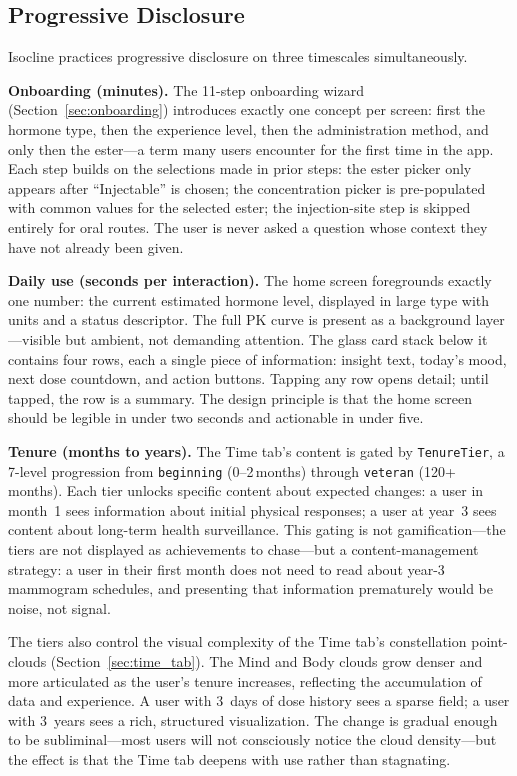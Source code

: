 \documentclass[11pt,a4paper]{article}
\newcommand{\code}[1]{\texttt{\small #1}}
\begin{document}
\subsection{Progressive Disclosure}
\label{sec:progressive}

Isocline practices progressive disclosure on three timescales simultaneously.

\textbf{Onboarding (minutes).} The 11-step onboarding wizard
(Section~\ref{sec:onboarding}) introduces exactly one concept per screen:
first the hormone type, then the experience level, then the
administration method, and only then the ester---a term many users
encounter for the first time in the app. Each step builds on the
selections made in prior steps: the ester picker only appears after
``Injectable'' is chosen; the concentration picker is pre-populated with
common values for the selected ester; the injection-site step is skipped
entirely for oral routes. The user is never asked a question whose
context they have not already been given.

\textbf{Daily use (seconds per interaction).} The home screen foregrounds
exactly one number: the current estimated hormone level, displayed in
large type with units and a status descriptor. The full PK curve is
present as a background layer---visible but ambient, not demanding
attention. The glass card stack below it contains four rows, each a
single piece of information: insight text, today's mood, next dose
countdown, and action buttons. Tapping any row opens detail; until
tapped, the row is a summary. The design principle is that the home
screen should be legible in under two seconds and actionable in under
five.

\textbf{Tenure (months to years).} The Time tab's content is gated by
\code{TenureTier}, a 7-level progression from \code{beginning}
(0--2\,months) through \code{veteran} (120+\,months). Each tier unlocks
specific content about expected changes: a user in month~1 sees
information about initial physical responses; a user at year~3 sees
content about long-term health surveillance. This gating is not
gamification---the tiers are not displayed as achievements to chase---but
a content-management strategy: a user in their first month does not need
to read about year-3 mammogram schedules, and presenting that information
prematurely would be noise, not signal.

The tiers also control the visual complexity of the Time tab's
constellation point-clouds (Section~\ref{sec:time_tab}). The Mind and
Body clouds grow denser and more articulated as the user's tenure
increases, reflecting the accumulation of data and experience. A user
with 3~days of dose history sees a sparse field; a user with 3~years sees
a rich, structured visualization. The change is gradual enough to be
subliminal---most users will not consciously notice the cloud
density---but the effect is that the Time tab deepens with use rather
than stagnating.
\end{document}

